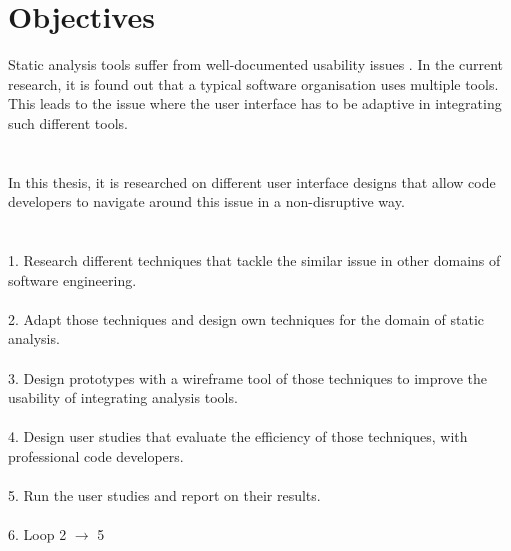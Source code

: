 \chapter{Objectives}
\label{ch:objectives}

Static analysis tools suffer from well-documented usability issues \cite{CB16,JSMB13}. In the current research, it is found out that a typical software organisation uses multiple tools. This leads to the issue where the user interface has to be adaptive in integrating such different tools. \\ \\ \\
In this thesis, it is researched on different user interface designs that allow code developers to navigate around
this issue in a non-disruptive way. \\ \\ \\
1. Research different techniques that tackle the similar issue in other domains of software
engineering. \\ \\
2. Adapt those techniques and design own techniques for the domain of static analysis. \\ \\
3. Design prototypes with a wireframe tool \cite{B} of those techniques to improve the usability of integrating analysis tools. \\ \\
4. Design user studies that evaluate the efficiency of those techniques, with professional code developers. \\ \\
5. Run the user studies and report on their results. \\ \\
6. Loop 2 $\rightarrow$ 5 

\let\cleardoublepage\clearpage